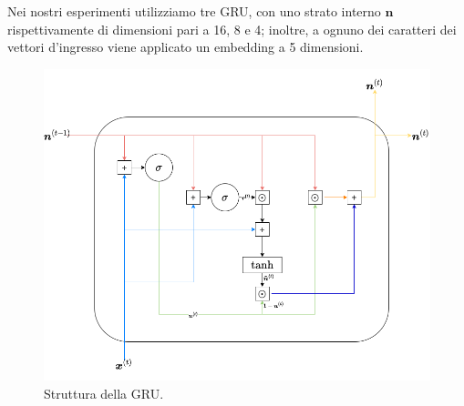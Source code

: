 \documentclass[../../main.tex]{subfiles}
\begin{document}
    Nei nostri esperimenti utilizziamo tre GRU, con uno strato interno $\boldsymbol{n}$ rispettivamente di dimensioni pari a 16, 8 e 4; inoltre, a ognuno dei caratteri dei vettori d'ingresso viene applicato un embedding a 5 dimensioni.


    \begin{figure}[H]
        \centering
        \includegraphics[width=\textwidth]{immagini/6_4/gruSchema.drawio.png}
        \caption{Struttura della GRU.}
        \label{fig:strutturaGRU}
    \end{figure}
\end{document}
